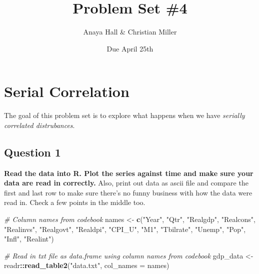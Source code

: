\documentclass[11pt,]{article}
\title{Problem Set \#4}
\author{Anaya Hall \& Christian Miller}
\date{Due April 25th}
\newenvironment{Shaded}{\begin{snugshade}}{\end{snugshade}}
\newcommand{\KeywordTok}[1]{\textcolor[rgb]{0.13,0.29,0.53}{\textbf{#1}}}
\newcommand{\DataTypeTok}[1]{\textcolor[rgb]{0.13,0.29,0.53}{#1}}
\newcommand{\StringTok}[1]{\textcolor[rgb]{0.31,0.60,0.02}{#1}}
\newcommand{\CommentTok}[1]{\textcolor[rgb]{0.56,0.35,0.01}{\textit{#1}}}
\newcommand{\OperatorTok}[1]{\textcolor[rgb]{0.81,0.36,0.00}{\textbf{#1}}}
\newcommand{\NormalTok}[1]{#1}
\begin{document}
\maketitle

\section{Serial Correlation}\label{serial-correlation}

The goal of this problem set is to explore what happens when we have
\emph{serially correlated distrubances}.

\subsection{Question 1}\label{question-1}

\textbf{Read the data into R. Plot the series against time and make sure
your data are read in correctly.} Also, print out data as ascii file and
compare the first and last row to make sure there's no funny business
with how the data were read in. Check a few points in the middle too.

\begin{Shaded}
\begin{Highlighting}[]
\CommentTok{# Column names from codebook}
\NormalTok{names <-}\StringTok{ }\KeywordTok{c}\NormalTok{(}\StringTok{"Year"}\NormalTok{, }\StringTok{"Qtr"}\NormalTok{, }\StringTok{"Realgdp"}\NormalTok{, }\StringTok{"Realcons"}\NormalTok{, }\StringTok{"Realinvs"}\NormalTok{, }\StringTok{"Realgovt"}\NormalTok{, }\StringTok{"Realdpi"}\NormalTok{, }\StringTok{"CPI_U"}\NormalTok{, }\StringTok{"M1"}\NormalTok{, }\StringTok{"Tbilrate"}\NormalTok{, }\StringTok{"Unemp"}\NormalTok{, }\StringTok{"Pop"}\NormalTok{, }\StringTok{"Infl"}\NormalTok{, }\StringTok{"Realint"}\NormalTok{)}

\CommentTok{# Read in txt file as data.frame using column names from codebook}
\NormalTok{gdp_data <-}\StringTok{ }\NormalTok{readr}\OperatorTok{::}\KeywordTok{read_table2}\NormalTok{(}\StringTok{"data.txt"}\NormalTok{,}
                             \DataTypeTok{col_names =}\NormalTok{ names) }
\end{Highlighting}
\end{Shaded}
\end{document}
